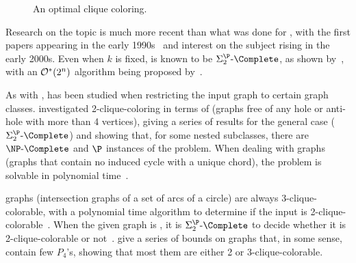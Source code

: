 

\begin{figure}[!htb]
    \centering
    \caption{An optimal clique coloring.}
    \label{fig:clique_color}
\end{figure}

Research on the topic is much more recent than what was done for , with the first papers appearing in the early 1990s~\citep{first_clique_color} and interest on the subject rising in the early 2000s.
Even when $k$ is fixed,  is known to be $\SiP{2}\text{-}\Complete$, as shown by~\cite{clique_coloring_complexity}, with an $\mathcal{O}^*\!\left(2^n\right)$ algorithm being proposed by~\cite{clique_color_algorithm}.

As with ,  has been studied when restricting the input graph to certain graph classes.
\cite{weakly_clique_color} investigated 2-clique-coloring in terms of  (graphs free of any hole or anti-hole with more than 4 vertices), giving a series of results for the general case ($\SiP{2}\text{-}\Complete$) and showing that, for some nested subclasses, there are $\NPc$ and $\P$ instances of the problem.
When dealing with  graphs (graphs that contain no induced cycle with a unique chord), the problem is solvable in polynomial time~\citep{unichord_coloring}.

 graphs (intersection graphs of a set of arcs of a circle) are always 3-clique-colorable, with a polynomial time algorithm to determine if the input is 2-clique-colorable~\citep{clique_circular_arc}.
When the given graph is , it is $\SiP{2}\text{-}\Complete$ to decide whether it is 2-clique-colorable or not~\citep{clique_oddhole}.
\cite{clique_coloring_few_p4} give a series of bounds on graphs that, in some sense, contain few $P_4$'s, showing that most them are either 2 or 3-clique-colorable.

